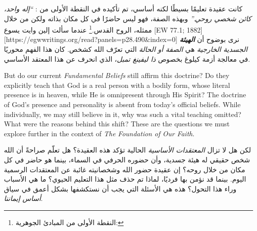 كانت عقيدة  تعليمًا بسيطًا لكنه أساسي، تم تأكيده في النقطة الأولى من : \textit{“إله واحد، كائن شخصي روحي.”} وبهذه الصفة، فهو ليس حاضرًا في كل مكان بذاته ولكن من خلال ممثله، الروح القدس.\footnote{النقطة الأولى من المبادئ الجوهرية: } عندما سألت إلين وايت يسوع [EW 77.1; 1882][https://egwwritings.org/read?panels=p28.490&index=0] نرى بوضوح أن \textit{\textbf{الهيئة} الجسدية الخارجية} هي \textit{الصفة أو الحالة} التي تعرّف الله كشخص. كان هذا الفهم محوريًا في معالجة أزمة كيلوغ بخصوص \textit{ذا ليفينغ تمبل}، الذي انحرف عن هذا المعتقد الأساسي.


But do our current \textit{Fundamental Beliefs} still affirm this doctrine? Do they explicitly teach that God is a real person with a bodily form, whose literal presence is in heaven, while He is omnipresent through His Spirit? The doctrine of God’s presence and personality is absent from today’s official beliefs. While individually, we may still believe in it, why was such a vital teaching omitted? What were the reasons behind this shift? These are the questions we must explore further in the context of \textit{The Foundation of Our Faith}.


لكن هل لا تزال \textit{المعتقدات الأساسية} الحالية تؤكد هذه العقيدة؟ هل تعلّم صراحةً أن الله شخص حقيقي له هيئة جسدية، وأن حضوره الحرفي في السماء، بينما هو حاضر في كل مكان من خلال روحه؟ إن عقيدة حضور الله وشخصانيته غائبة عن المعتقدات الرسمية اليوم. بينما قد نؤمن بها فرديًا، لماذا تم حذف مثل هذا التعليم الحيوي؟ ما هي الأسباب وراء هذا التحول؟ هذه هي الأسئلة التي يجب أن نستكشفها بشكل أعمق في سياق \textit{أساس إيماننا}.


